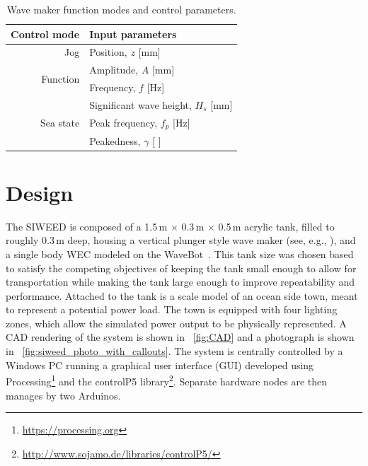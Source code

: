 \documentclass[hardware,article,submit,pdftex,moreauthors]{Definitions/mdpi}
\begin{document}
\begin{table}[tb]
  \caption{Wave maker function modes and control parameters.}
  \label{tab:wave_maker_controls}
  \centering

  \begin{tabular}{rl}
  \hline
  \textbf{Control mode}      & \textbf{Input parameters}        \\
  \hline
  Jog                        & Position, $z$ {[}mm{]}                \\
  \hline
  \multirow{2}{*}{Function}  & Amplitude, $A$ {[}mm{]}               \\
                             & Frequency, $f$ {[}Hz{]}               \\
  \hline
  \multirow{3}{*}{Sea state} & Significant wave height, $H_s$ {[}mm{]} \\
                             & Peak frequency, $f_p$ {[}Hz{]}          \\
                             & Peakedness, $\gamma$ {[} {]}               \\       
  \hline
  \end{tabular}
\end{table}


\section{Design} %
The SIWEED is composed of a 1.5\,m $\times{}$ 0.3\,m $\times{}$ 0.5\,m acrylic tank, filled to roughly 0.3\,m deep, housing a vertical plunger style wave maker (see, e.g., \cite{hyun1976simplified}), and a single body WEC modeled on the WaveBot~\cite{Coe2016a}.
This tank size was chosen based to satisfy the competing objectives of keeping the tank small enough to allow for transportation while making the tank large enough to improve repeatability and performance.
Attached to the tank is a scale model of an ocean side town, meant to represent a potential power load.
The town is equipped with four lighting zones, which allow the simulated power output to be physically represented.
A CAD rendering of the system is shown in \figurename~\ref{fig:CAD} and a photograph is shown in \figurename~\ref{fig:siweed_photo_with_callouts}.
The system is centrally controlled by a Windows PC running a graphical user interface (GUI) developed using Processing\footnote{\url{https://processing.org}} and the controlP5 library\footnote{\url{http://www.sojamo.de/libraries/controlP5/}}.
Separate hardware nodes are then manages by two Arduinos.
\end{document}
